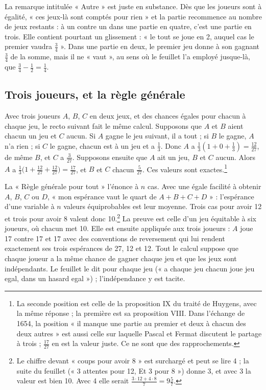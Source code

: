 \documentclass[11pt,a4paper]{article}
\begin{document}
La remarque intitulée « Autre » est juste en substance. Dès que les joueurs sont
à égalité, « ces jeux-là sont comptés pour rien » et la partie recommence au
nombre de jeux restants : à un contre un dans une partie en quatre, c'est une
partie en trois. Elle contient pourtant un glissement : « le tout se joue en 2,
auquel cas le premier vaudra \(\frac34\) ». Dans une partie en deux, le premier
jeu donne à son gagnant \(\frac34\) de la somme, mais il ne « vaut », au sens
où le feuillet l'a employé jusque-là, que \(\frac34-\frac12=\frac14\).

\subsection*{Trois joueurs, et la règle générale}

Avec trois joueurs \(A\), \(B\), \(C\) en deux jeux, et des chances égales pour
chacun à chaque jeu, le recto suivant fait le même calcul. Supposons que \(A\)
et \(B\) aient chacun un jeu et \(C\) aucun. Si \(A\) gagne le jeu suivant, il a
tout ; si \(B\) le gagne, \(A\) n'a rien ; si \(C\) le gagne, chacun est à un
jeu et a \(\frac13\). Donc \(A\) a \(\frac13(1+0+\frac13)=\frac{12}{27}\), de
même \(B\), et \(C\) a \(\frac3{27}\). Supposons ensuite que \(A\) ait un jeu,
\(B\) et \(C\) aucun. Alors \(A\) a
\(\frac13\bigl(1+\frac{12}{27}+\frac{12}{27}\bigr)=\frac{17}{27}\), et \(B\) et
\(C\) chacun \(\frac5{27}\). Ces valeurs sont exactes.\footnote{La seconde
position est celle de la proposition IX du traité de Huygens, avec la même
réponse ; la première est sa proposition VIII. Dans l'échange de 1654, la
position « il manque une partie au premier et deux à chacun des deux autres »
est aussi celle sur laquelle Pascal et Fermat discutent le partage à trois ;
\(\frac{17}{27}\) en est la valeur juste. Ce ne sont que des rapprochements.}

La « Règle générale pour tout » l'énonce à \(n\) cas. Avec une égale facilité à
obtenir \(A\), \(B\), \(C\) ou \(D\), « mon espérance vaut le quart de
\(A+B+C+D\) » : l'espérance d'une variable à \(n\) valeurs équiprobables est
leur moyenne. Trois cas pour avoir 12 et trois pour avoir 8 valent donc
10.\footnote{Le chiffre devant « coups pour avoir 8 » est surchargé et peut se
lire 4 ; la suite du feuillet (« 3 attentes pour 12, Et 3 pour 8 ») donne 3, et
avec 3 la valeur est bien 10. Avec 4 elle serait \(\frac{3\cdot12+4\cdot8}{7}
=9\frac57\).} La preuve est celle d'un jeu équitable à six joueurs, où chacun
met 10. Elle est ensuite appliquée aux trois joueurs : \(A\) joue 17 contre 17
et 17 avec des conventions de reversement qui lui rendent exactement ses trois
espérances de 27, 12 et 12. Tout le calcul suppose que chaque joueur a la même
chance de gagner chaque jeu et que les jeux sont indépendants. Le feuillet le
dit pour chaque jeu (« a chaque jeu chacun joue jeu egal, dans un hasard
egal ») ; l'indépendance y est tacite.
\end{document}
